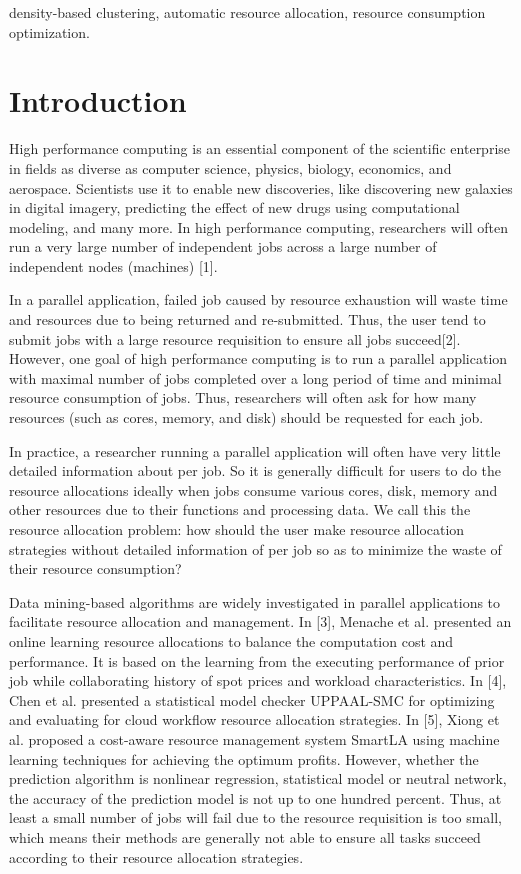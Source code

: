 \documentclass[conference]{IEEEtran}
\begin{document}
\begin{IEEEkeywords}
density-based clustering, automatic resource allocation, resource consumption optimization.
\end{IEEEkeywords}

\section{Introduction}
High performance computing is an essential component of the scientific enterprise in fields as diverse as computer science, physics, biology, economics, and aerospace. Scientists use it to enable new discoveries, like discovering new galaxies in digital imagery, predicting the effect of new drugs using computational modeling, and many more. In high performance computing, researchers will often run a very large number of independent jobs across a large number of independent nodes (machines) [1].

In a parallel application, failed job caused by resource exhaustion will waste time and resources due to being returned and re-submitted. Thus, the user tend to submit jobs with a large resource requisition to ensure all jobs succeed[2]. However, one goal of high performance computing is to run a parallel application with maximal number of jobs completed over a long period of time and minimal resource consumption of jobs. Thus, researchers will often ask for how many resources (such as cores, memory, and disk) should be requested for each job.

In practice, a researcher running a parallel application will often have very little detailed information about per job. So it is generally difficult for users to do the resource allocations ideally when jobs consume various cores, disk, memory and other resources due to their functions and processing data. We call this the resource allocation problem: how should the user make resource allocation strategies without detailed information of per job so as to minimize the waste of their resource consumption?

Data mining-based algorithms are widely investigated in parallel applications to facilitate resource allocation and management. In [3], Menache et al. presented an online learning resource allocations to balance the computation cost and performance. It is based on the learning from the executing performance of prior job while collaborating history of spot prices and workload characteristics. In [4], Chen et al. presented a statistical model checker UPPAAL-SMC for optimizing and evaluating for cloud workflow resource allocation strategies. In [5], Xiong et al. proposed a cost-aware resource management system SmartLA using machine learning techniques for achieving the optimum profits. However, whether the prediction algorithm is nonlinear regression, statistical model or neutral network, the accuracy of the prediction model is not up to one hundred percent. Thus, at least a small number of jobs will fail due to the resource requisition is too small, which means their methods are generally not able to ensure all tasks succeed according to their resource allocation strategies.
\end{document}
